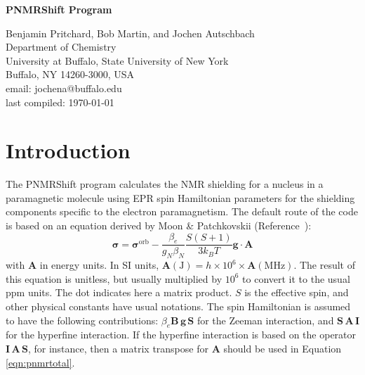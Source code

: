 \documentclass[11pt]{report}
\newcommand\PNMRShift{\textsf{PNMRShift}\xspace}
\renewcommand{\vec}{\bm}
\newcommand{\ten}{\bm}
\newcommand{\sci}[2]{\ensuremath{#1\times10^{#2}}}
\begin{document}
\begin{titlepage}
\begin{center}
{\Large \textbf{PNMRShift Program}}


\vspace*{1cm}

{\large
Benjamin Pritchard, Bob Martin, and Jochen Autschbach\\[2ex]
Department of Chemistry\\
University at Buffalo, State University of New York\\
Buffalo, NY 14260-3000, USA\\[2ex]
email: jochena@buffalo.edu\\[3ex]
last compiled: \today     
}
\end{center}  
\end{titlepage}

\tableofcontents





\chapter{Introduction}
\label{chap:intro}

The \PNMRShift program calculates the NMR shielding for a nucleus in a
paramagnetic molecule using EPR spin Hamiltonian parameters for the
shielding components specific to the electron paramagnetism. The
default route of the code is based on an equation derived by Moon \&
Patchkovskii (Reference~):
%
\begin{equation}
    \ten{\sigma} = \ten{\sigma}^{\mathrm{orb}} - \frac{\beta_e}{g_N \beta_N}\frac{S(S+1)}{3k_{B}T} \ten{g} \cdot \ten{A}
\label{eqn:pnmrtotal}
\end{equation}
%
with $\ten{A}$ in energy units.
In SI units, $\ten{A}(\mathrm{J}) = \sci{h}{6} \times \ten{A}(\mathrm{MHz})$.
The result of this equation is unitless, but usually
multiplied by $10^{6}$ to convert it to the usual ppm units. The dot
indicates here a matrix product. $S$ is the effective spin, and other
physical constants have usual notations. The spin Hamiltonian is assumed to
have the following contributions: $\beta_e \vec{B}\, \ten{g} \,
\vec{S}$ for the Zeeman interaction, and $\vec{S}\, \ten{A}\, \vec{I}$
for the hyperfine interaction. If the hyperfine interaction is based
on the operator $\vec{I}\, \ten{A}\, \vec{S}$, for instance, then a
matrix transpose for $\ten{A}$ should be used in Equation
\ref{eqn:pnmrtotal}. 
\end{document}
